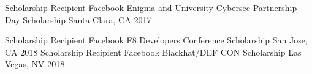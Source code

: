 




\begin{cvhonors}

  \cvhonor
    {Scholarship Recipient} %
    {Facebook Enigma and University Cybersec Partnership Day Scholarship} %
    {Santa Clara, CA} %
    {2017} %

    \cvhonor
    {Scholarship Recipient} %
    {Facebook F8 Developers Conference Scholarship} %
    {San Jose, CA} %
    {2018} %
  \cvhonor
  {Scholarship Recipient} %
  {Facebook Blackhat/DEF CON Scholarship} %
  {Las Vegas, NV} %
  {2018} %

\end{cvhonors}
